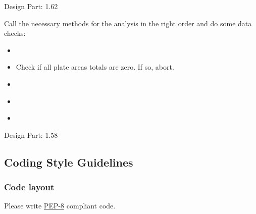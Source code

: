\documentclass[letterpaper,10pt,english]{sphinxmanual}
\begin{document}
\begin{fulllineitems}
\begin{fulllineitems}
Design Part: 1.62

\end{fulllineitems}


\begin{fulllineitems}
\label{setlyze/analysis/spot_preference:setlyze.analysis.spot_preference.Start.run}
Call the necessary methods for the analysis in the right order
and do some data checks:
\begin{itemize}
\item {} 
{\hyperref[setlyze/analysis/spot_preference:setlyze.analysis.spot_preference.Start.get_areas_totals_observed]{}}

\item {} 
Check if all plate areas totals are zero. If so, abort.

\item {} 
{\hyperref[setlyze/analysis/spot_preference:setlyze.analysis.spot_preference.Start.get_areas_totals_expected]{}}

\item {} 
{\hyperref[setlyze/analysis/spot_preference:setlyze.analysis.spot_preference.Start.chi_square_tester]{}}

\item {} 
{\hyperref[setlyze/analysis/spot_preference:setlyze.analysis.spot_preference.Start.generate_report]{}}

\end{itemize}

Design Part: 1.58

\end{fulllineitems}


\end{fulllineitems}



\subsection{Coding Style Guidelines}
\label{developer_guide:coding-style-guidelines}

\subsubsection{Code layout}
\label{developer_guide:code-layout}
Please write \href{http://www.python.org/peps/pep-0008.html}{PEP-8}
compliant code.
\end{document}
